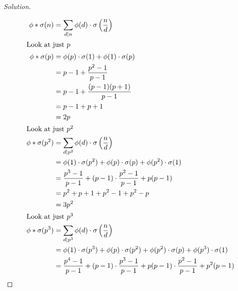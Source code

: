 \documentclass[11pt]{article}
\newenvironment{solution}
  {\renewcommand\qedsymbol{$~$}\begin{proof}[Solution]$ $\par\nobreak\ignorespaces}
  {\end{proof}}
\begin{document}
\begin{solution}
  \begin{align*}
    \phi * \sigma(n)   & = \sum_{d|n} \phi(d) \cdot \sigma\left(\frac{n}{d}\right)                                                   \\
    \intertext{Look at just $p$}
    \phi * \sigma(p)   & = \phi(p) \cdot \sigma(1)  + \phi(1) \cdot \sigma(p)                                                        \\
                       & = p-1 + \frac{p^{2}-1}{p-1}                                                                                 \\
                       & = p-1 + \frac{(p-1)(p+1)}{p-1}                                                                              \\
                       & = p-1 + p+1                                                                                                 \\
                       & = 2p                                                                                                        \\
    \intertext{Look at just $p^2$}
    \phi * \sigma(p^2) & = \sum_{d|p^2} \phi(d) \cdot \sigma\left(\frac{n}{d}\right)                                                 \\
                       & = \phi(1) \cdot \sigma(p^2)+ \phi(p) \cdot \sigma(p)+ \phi(p^2) \cdot \sigma(1)                             \\
                       & =  \frac{p^3-1}{p-1} + (p-1) \cdot \frac{p^{2}-1}{p-1} + p(p-1)                                             \\
                       & =  p^2 + p + 1 + p^{2}-1 + p^2 - p                                                                          \\
                       & =  3p^2                                                                                                     \\
    \intertext{Look at just $p^3$}
    \phi * \sigma(p^3) & = \sum_{d|p^3} \phi(d) \cdot \sigma\left(\frac{n}{d}\right)                                                 \\
                       & = \phi(1) \cdot \sigma(p^3)+ \phi(p) \cdot \sigma(p^2)+\phi(p^2) \cdot \sigma(p) +\phi(p^3) \cdot \sigma(1) \\
                       & =  \frac{p^{4}-1}{p-1} + (p-1)\cdot \frac{p^{3}-1}{p-1} + p(p-1)\cdot \frac{p^{2}-1}{p-1} + p^{2}(p-1)      \\

\end{align*}
\end{solution}
\end{document}
